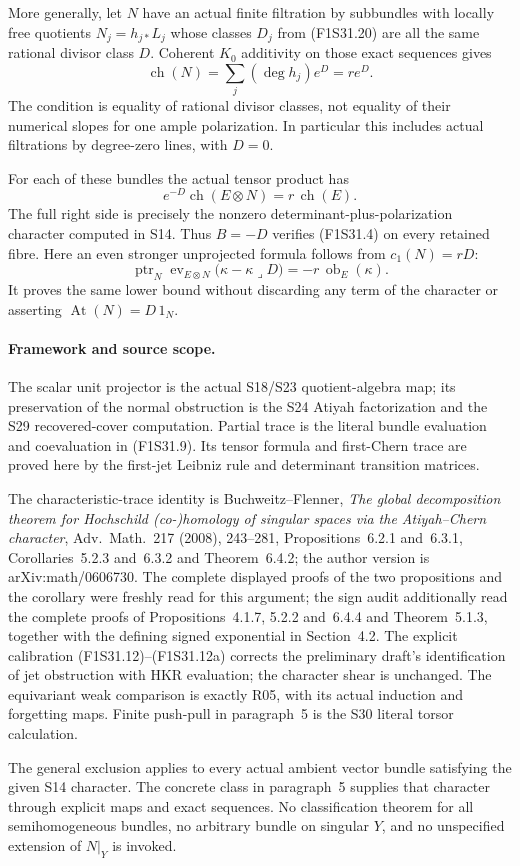More generally, let $N$ have an actual finite filtration
by subbundles with locally free quotients $N_j=h_{j*}L_j$
whose classes $D_j$ from (F1S31.20) are all the same
rational divisor class $D$. Coherent $K_0$ additivity
on those exact sequences gives
\[
 \operatorname{ch}(N)=\sum_j(\deg h_j)e^D=r e^D.
 \tag{F1S31.23}
\]
The condition is equality of rational divisor classes,
not equality of their numerical slopes for one ample
polarization. In particular this includes actual
filtrations by degree-zero lines, with $D=0$.

For each of these bundles the actual tensor product has
\[
                    e^{-D}\operatorname{ch}(E\otimes N)
                                   =r\,\operatorname{ch}(E).
 \tag{F1S31.24}
\]
The full right side is precisely the nonzero
determinant-plus-polarization character computed in S14.
Thus $B=-D$ verifies (F1S31.4) on every retained fibre.
Here an even stronger unprojected formula follows from
$c_1(N)=rD$:
\[
 \operatorname{ptr}_N
     \operatorname{ev}_{E\otimes N}
          \bigl(\kappa-\kappa\mathbin{\lrcorner}D\bigr)
                     =-r\,\operatorname{ob}_E(\kappa).
 \tag{F1S31.25}
\]
It proves the same lower bound without discarding
any term of the character or asserting
$\operatorname{At}(N)=D\,1_N$.

\paragraph{Framework and source scope.}
The scalar unit projector is the actual S18/S23
quotient-algebra map; its preservation of the
normal obstruction is the S24 Atiyah factorization
and the S29 recovered-cover computation.
Partial trace is the literal bundle evaluation and
coevaluation in (F1S31.9). Its tensor formula and
first-Chern trace are proved here by the first-jet
Leibniz rule and determinant transition matrices.

The characteristic-trace identity is
Buchweitz--Flenner, \emph{The global decomposition
theorem for Hochschild (co-)homology of singular
spaces via the Atiyah--Chern character},
Adv.\ Math.~217 (2008), 243--281,
Propositions~6.2.1 and~6.3.1,
Corollaries~5.2.3 and~6.3.2 and Theorem~6.4.2;
the author version is arXiv:math/0606730.
The complete displayed proofs of the two propositions
and the corollary were freshly read for this argument;
the sign audit additionally read the complete proofs
of Propositions~4.1.7, 5.2.2 and~6.4.4 and
Theorem~5.1.3,
together with the defining signed exponential in
Section~4.2. The explicit calibration
(F1S31.12)--(F1S31.12a) corrects the preliminary
draft's identification of jet obstruction with HKR
evaluation; the character shear is unchanged.
The equivariant weak comparison is
exactly R05, with its actual induction and forgetting
maps. Finite push-pull in paragraph~5 is the S30
literal torsor calculation.

The general exclusion applies to every actual ambient
vector bundle satisfying the given S14 character.
The concrete class in paragraph~5 supplies that
character through explicit maps and exact sequences.
No classification theorem for all semihomogeneous
bundles, no arbitrary bundle on singular $Y$, and no
unspecified extension of $N|_Y$ is invoked.

